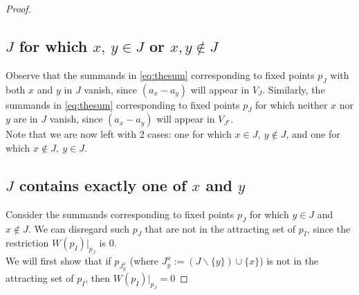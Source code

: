 \documentclass[12 pt]{article}
\theoremstyle{plain}
\theoremstyle{plain}
\theoremstyle{plain}
\theoremstyle{plain}
\theoremstyle{plain}
\theoremstyle{plain}
\theoremstyle{plain}
\theoremstyle{plain}
\theoremstyle{plain}
\theoremstyle{plain}
\theoremstyle{remark}
\theoremstyle{remark}
\theoremstyle{definition}
\theoremstyle{definition}
\theoremstyle{definition}
\theoremstyle{definition}
\theoremstyle{definition}
\theoremstyle{definition}
\begin{document}
\begin{proof}
\subsection{$J$ for which $x,\ y\in J$ or $x,y \not\in J$} 
Observe that the summands in \eqref{eq:thesum} corresponding to fixed points $p_J$ with both $x$ and $y$ in $J$ vanish, since $(a_x - a_y)$ will appear in $V_J$. Similarly, the summands in \eqref{eq:thesum} corresponding to fixed points $p_J$ for which neither $x$ nor $y$ are in $J$ vanish, since $(a_{x}-a_{y})$ will appear in $V_{J^{c}}$. \\

Note that we are now left with 2 cases: one for which $x\in J,\ y\notin J$, and one for which $x\notin J,\ y\in J$.\\
\subsection{$J$ contains exactly one of $x$ and $y$}
 Consider the summands corresponding to fixed points $p_{J}$ for which $y \in J$ and $x \notin J$. We can disregard such $p_{J}$ that are not in the attracting set of $p_{I}$, since the restriction $W(p_I)|_{p_J}$ is 0.\\


We will first show that if $p_{J_{y}^{x}}$ (where $J^{x}_{y}:=\left(J\backslash\{y\}\right)\cup\{x\}$) is not in the attracting set of $p_{I}$, then $W(p_{I})|_{p_{J}}=0$ 



\end{proof}
\end{document}
